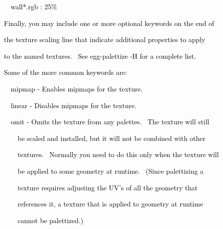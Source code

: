 \documentclass[a4paper]{article}
\newcommand\textstyleOOoComputerKeyWord[1]{\textrm{\textcolor[rgb]{0.0,0.0,0.5019608}{#1}}}
\begin{document}
\bigskip

{\color{black}
\textstyleOOoComputerKeyWord{\textcolor{black}{\ \ wall*.rgb : 25\%}}}


\bigskip

{\color{black}
\textstyleOOoComputerKeyWord{\textcolor{black}{Finally, you may include one or more optional keywords on the end of}}}

{\color{black}
\textstyleOOoComputerKeyWord{\textcolor{black}{the texture scaling line that indicate additional properties to apply}}}

{\color{black}
\textstyleOOoComputerKeyWord{\textcolor{black}{to the named textures. \ See egg-palettize -H for a complete list.}}}

{\color{black}
\textstyleOOoComputerKeyWord{\textcolor{black}{Some of the more common keywords are:}}}


\bigskip

{\color{black}
\textstyleOOoComputerKeyWord{\textcolor{black}{\ \ mipmap - Enables mipmaps for the texture.}}}

\clearpage
\bigskip


\bigskip

{\color{black}
\textstyleOOoComputerKeyWord{\textcolor{black}{\ \ linear - Disables mipmaps for the texture.}}}


\bigskip

{\color{black}
\textstyleOOoComputerKeyWord{\textcolor{black}{\ \ omit - Omits the texture from any palettes. \ The texture will
still}}}

{\color{black}
\textstyleOOoComputerKeyWord{\textcolor{black}{\ \ \ \ be scaled and installed, but it will not be combined with
other}}}

{\color{black}
\textstyleOOoComputerKeyWord{\textcolor{black}{\ \ \ \ textures. \ Normally you need to do this only when the texture
will}}}

{\color{black}
\textstyleOOoComputerKeyWord{\textcolor{black}{\ \ \ \ be applied to some geometry at runtime. \ (Since palettizing a}}}

{\color{black}
\textstyleOOoComputerKeyWord{\textcolor{black}{\ \ \ \ texture requires adjusting the UV's of all the geometry that}}}

{\color{black}
\textstyleOOoComputerKeyWord{\textcolor{black}{\ \ \ \ references it, a texture that is applied to geometry at
runtime}}}

{\color{black}
\textstyleOOoComputerKeyWord{\textcolor{black}{\ \ \ \ cannot be palettized.)}}}
\end{document}
